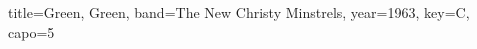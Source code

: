 \documentclass{skrul-leadsheet}
\begin{document}
\begin{song}[transpose-capo=true]{title={Green, Green}, band={The New Christy Minstrels}, year={1963}, key={C}, capo={5}}

\end{song}
\end{document}
